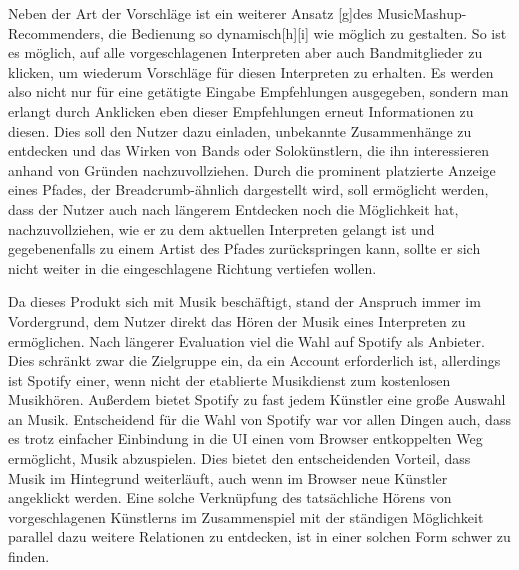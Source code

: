 Neben der Art der Vorschläge ist ein weiterer Ansatz [g]des MusicMashup-Recommenders, die Bedienung so dynamisch[h][i] wie möglich zu gestalten. So ist es möglich, auf alle vorgeschlagenen Interpreten aber auch Bandmitglieder zu klicken, um wiederum Vorschläge für diesen Interpreten zu erhalten. Es werden also nicht nur für eine getätigte Eingabe Empfehlungen ausgegeben, sondern man erlangt durch Anklicken eben dieser Empfehlungen erneut Informationen zu diesen. Dies soll den Nutzer dazu einladen, unbekannte Zusammenhänge zu entdecken und das Wirken von Bands oder Solokünstlern, die ihn interessieren anhand von Gründen nachzuvollziehen. Durch die prominent platzierte Anzeige eines Pfades, der Breadcrumb-ähnlich dargestellt wird, soll ermöglicht werden, dass der Nutzer auch nach längerem Entdecken noch die Möglichkeit hat, nachzuvollziehen, wie er zu dem aktuellen Interpreten gelangt ist und gegebenenfalls zu einem Artist des Pfades zurückspringen kann, sollte er sich nicht weiter in die eingeschlagene Richtung vertiefen wollen.

Da dieses Produkt sich mit Musik beschäftigt, stand der Anspruch immer im Vordergrund, dem Nutzer direkt das Hören der Musik eines Interpreten zu ermöglichen. Nach längerer Evaluation viel die Wahl auf Spotify als Anbieter. Dies schränkt zwar die Zielgruppe ein, da ein Account erforderlich ist, allerdings ist Spotify einer, wenn nicht der etablierte Musikdienst zum kostenlosen Musikhören. Außerdem bietet Spotify zu fast jedem Künstler eine große Auswahl an Musik. Entscheidend für die Wahl von Spotify war vor allen Dingen auch, dass es trotz einfacher Einbindung in die UI einen vom Browser entkoppelten Weg ermöglicht, Musik abzuspielen. Dies bietet den entscheidenden Vorteil, dass Musik im Hintegrund weiterläuft, auch wenn im Browser neue Künstler angeklickt werden. Eine solche Verknüpfung des tatsächliche Hörens von vorgeschlagenen Künstlerns im Zusammenspiel mit der ständigen Möglichkeit parallel dazu weitere Relationen zu entdecken, ist in einer solchen Form schwer zu finden.



